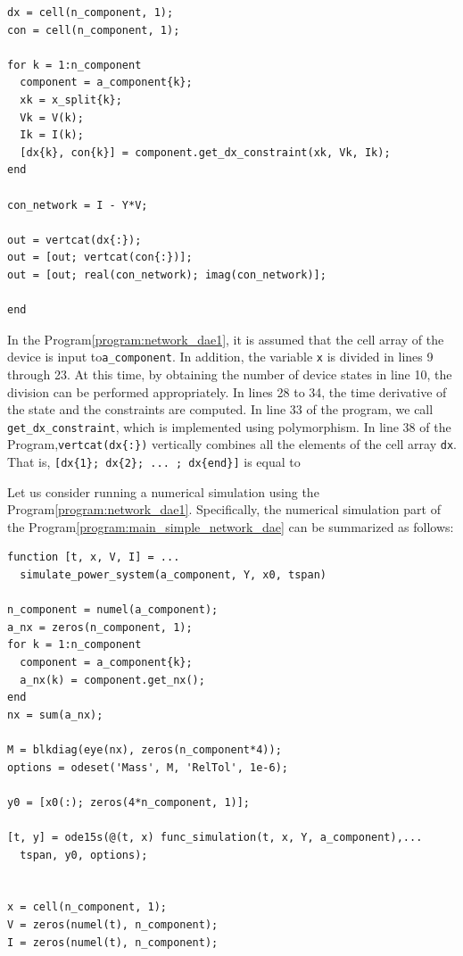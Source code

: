 \documentclass[tombow,dvipdfmx]{corona-a5-1.1}
\begin{document}
\begin{例}
\begin{PROGRAMA}[count,title={func\_simulation.m}]
\begin{verbatim}
dx = cell(n_component, 1);
con = cell(n_component, 1);

for k = 1:n_component
  component = a_component{k};
  xk = x_split{k};
  Vk = V(k);
  Ik = I(k);
  [dx{k}, con{k}] = component.get_dx_constraint(xk, Vk, Ik);
end

con_network = I - Y*V;

out = vertcat(dx{:});
out = [out; vertcat(con{:})];
out = [out; real(con_network); imag(con_network)];

end
\end{verbatim}
\end{PROGRAMA}

In the Program\nobreak\ref{program:network_dae1}, it is assumed that the cell array of the device is input to\verb|a_component|.
In addition, the variable \verb|x| is divided in lines 9 through 23.
At this time, by obtaining the number of device states in line 10, the division can be performed appropriately.
In lines 28 to 34, the time derivative of the state and the constraints are computed.
In line 33 of the program, we call \verb|get_dx_constraint|, which is implemented using polymorphism.
In line 38 of the Program,\verb|vertcat(dx{:})| vertically combines all the elements of the cell array \verb|dx|.
That is, \verb|[dx{1}; dx{2}; ... ; dx{end}]| is equal to

Let us consider running a numerical simulation using the Program\nobreak\ref{program:network_dae1}.
Specifically, the numerical simulation part of the Program\nobreak\ref{program:main_simple_network_dae} can be summarized as follows: 

\smallskip
\begin{PROGRAMA}[count,title={simulate\_power\_system.m}]\label{program:simulate_network1}
\begin{verbatim}
function [t, x, V, I] = ...
  simulate_power_system(a_component, Y, x0, tspan)

n_component = numel(a_component);
a_nx = zeros(n_component, 1);
for k = 1:n_component
  component = a_component{k};
  a_nx(k) = component.get_nx();
end
nx = sum(a_nx);

M = blkdiag(eye(nx), zeros(n_component*4));
options = odeset('Mass', M, 'RelTol', 1e-6);

y0 = [x0(:); zeros(4*n_component, 1)];

[t, y] = ode15s(@(t, x) func_simulation(t, x, Y, a_component),...
  tspan, y0, options);


x = cell(n_component, 1);
V = zeros(numel(t), n_component);
I = zeros(numel(t), n_component);


\end{verbatim}
\end{PROGRAMA}
\end{例}
\end{document}
